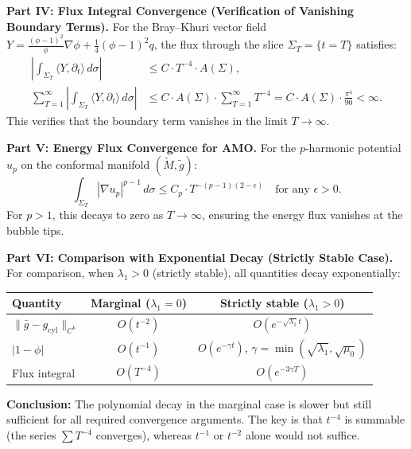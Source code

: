 \begin{proposition}
\textbf{Part IV: Flux Integral Convergence (Verification of Vanishing Boundary Terms).}
For the Bray--Khuri vector field $Y = \frac{(\phi-1)^2}{\phi}\nabla\phi + \frac{1}{4}(\phi-1)^2 q$, the flux through the slice $\Sigma_T = \{t = T\}$ satisfies:
\begin{align}
    \left| \int_{\Sigma_T} \langle Y, \partial_t \rangle \, d\sigma \right| 
    &\le C \cdot T^{-4} \cdot A(\Sigma), \\
    \sum_{T=1}^\infty \left| \int_{\Sigma_T} \langle Y, \partial_t \rangle \, d\sigma \right| 
    &\le C \cdot A(\Sigma) \cdot \sum_{T=1}^\infty T^{-4} = C \cdot A(\Sigma) \cdot \frac{\pi^4}{90} < \infty.
\end{align}
This verifies that the boundary term vanishes in the limit $T \to \infty$.

\textbf{Part V: Energy Flux Convergence for AMO.}
For the $p$-harmonic potential $u_p$ on the conformal manifold $(\tilde{M}, \tilde{g})$:
\begin{equation}
    \int_{\Sigma_T} |\nabla u_p|^{p-1} \, d\sigma \le C_p \cdot T^{-(p-1)(2-\epsilon)} \quad \text{for any } \epsilon > 0.
\end{equation}
For $p > 1$, this decays to zero as $T \to \infty$, ensuring the energy flux vanishes at the bubble tips.

\textbf{Part VI: Comparison with Exponential Decay (Strictly Stable Case).}
For comparison, when $\lambda_1 > 0$ (strictly stable), all quantities decay exponentially:
\begin{center}
\begin{tabular}{|l|c|c|}
\hline
\textbf{Quantity} & \textbf{Marginal ($\lambda_1 = 0$)} & \textbf{Strictly stable ($\lambda_1 > 0$)} \\
\hline
$\|\bar{g} - g_{\mathrm{cyl}}\|_{C^k}$ & $O(t^{-2})$ & $O(e^{-\sqrt{\lambda_1} t})$ \\
$|1 - \phi|$ & $O(t^{-1})$ & $O(e^{-\gamma t})$, $\gamma = \min(\sqrt{\lambda_1}, \sqrt{\mu_0})$ \\
Flux integral & $O(T^{-4})$ & $O(e^{-3\gamma T})$ \\
\hline
\end{tabular}
\end{center}

\textbf{Conclusion:} The polynomial decay in the marginal case is slower but still sufficient for all required convergence arguments. The key is that $t^{-4}$ is summable (the series $\sum T^{-4}$ converges), whereas $t^{-1}$ or $t^{-2}$ alone would not suffice.
\end{proposition}
